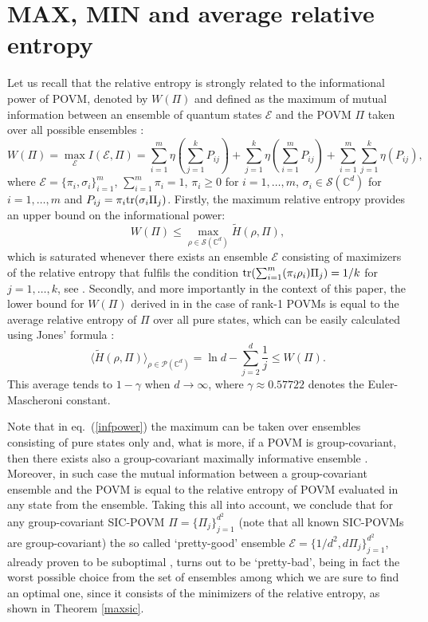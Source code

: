 \documentclass[11pt]{article}
\theoremstyle{remark}
\theoremstyle{definition}
\def\tr{\textnormal{tr}}
\begin{document}
\section{MAX, MIN and average relative entropy}
Let us recall that the relative entropy is strongly related to the  informational power of POVM, denoted by $W(\Pi)$ and defined as the maximum of mutual information between an ensemble of quantum states $\mathcal E$ and the POVM $\Pi$ taken over all possible ensembles \cite{DAretal11,Oreetal11}:
\begin{equation}\label{infpower}
W(\Pi)=\max_\mathcal E I(\mathcal E,\Pi)=\sum_{i=1}^m\eta(\sum_{j=1}^kP_{ij})+\sum_{j=1}^k\eta(\sum_{i=1}^m P_{ij})+\sum_{i=1}^m\sum_{j=1}^k \eta(P_{ij}),
\end{equation}
where $\mathcal E=\{\pi_i,\sigma_i\}_{i=1}^m$, $\sum_{i=1}^m \pi_i=1$, $\pi_i\geq 0$ for $i=1,\ldots,m$, $\sigma_i\in\mathcal S(\mathbb C^d)$ for $i=1,\ldots,m$ and $P_{ij}=\pi_i\tr(\sigma_i\Pi_j)$. 
Firstly, the maximum relative entropy  provides an upper bound on the informational power:
$$W(\Pi)\leq \max_{\rho\in\mathcal S(\mathbb C^d)}\widetilde{H}(\rho,\Pi),$$ which is saturated whenever there exists an ensemble $\mathcal E$ consisting of maximizers of the relative entropy that fulfils the condition $\tr(\sum_{i=1}^m(\pi_i\rho_i)\Pi_j)=1/k$ for $j=1,\ldots,k$, see \cite[p.\ 578]{SloSzy16}. Secondly, and more importantly in the context of this paper,  the lower bound for $W(\Pi)$ derived in \cite{DAr14} in the case of rank-1 POVMs is equal to the average relative entropy of $\Pi$ over all pure states, which can be easily calculated using Jones' formula \cite{Jon91,SloSzy16}: $$\langle \widetilde{H}(\rho,\Pi)\rangle _{\rho\in\mathcal{P}(
	\mathbb{C}^{d})  }    =\ln d-\sum_{j=2}^{d}\frac{1}{j}\leq W(\Pi).$$ This average tends to $1-\gamma$ when $d\rightarrow\infty$, where $\gamma\approx0.57722$ denotes the Euler-Mascheroni constant.



Note that  in eq.\ (\ref{infpower}) the maximum can be taken over ensembles consisting of pure states only and, what is more, if a POVM is group-covariant, then there exists also a group-covariant maximally informative ensemble \cite{Oreetal11}. Moreover, in such case the mutual information between a group-covariant ensemble and the POVM is equal to the relative entropy of POVM evaluated in any state from the ensemble.  Taking this all into account, we conclude that for any group-covariant SIC-POVM $\Pi=\{\Pi_j\}_{j=1}^{d^2}$ (note that all known SIC-POVMs are group-covariant) the so called `pretty-good' ensemble $\mathcal E=\{1/d^2,d\Pi_j\}_{j=1}^{d^2}$, already proven to be suboptimal \cite{DAretal14}, turns out to be `pretty-bad', being in fact the worst possible choice from the set of ensembles among which we are sure to find an optimal one, since it consists of the minimizers of the relative entropy, as  shown in Theorem \ref{maxsic}.   
\end{document}
